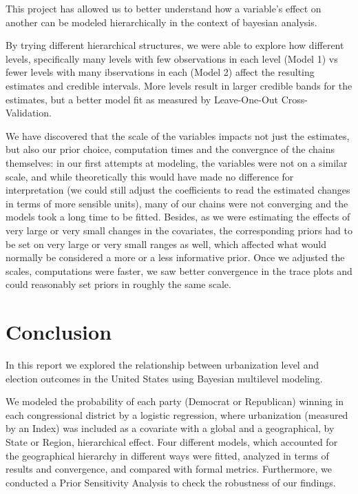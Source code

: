 \documentclass[12pt]{article}
\begin{document}
This project has allowed us to better understand how a variable's effect on another can be modeled hierarchically in the context of bayesian analysis.


By trying different hierarchical structures, we were able to explore how different levels, specifically many levels with few observations in each level (Model 1) vs fewer levels with many ibservations in each (Model 2) affect the resulting estimates and credible intervals. More levels result in larger credible bands for the estimates, but a better model fit as measured by Leave-One-Out Cross-Validation. 

We have discovered that the scale of the variables impacts not just the estimates, but also our prior choice, computation times and the convergnce of the chains themselves: in our first attempts at modeling, the variables were not on a similar scale, and while theoretically this would have made no difference for interpretation (we could still adjust the coefficients to read the estimated changes in terms of more sensible units), many of our chains were not converging and the models took a long time to be fitted.
Besides, as we were estimating the effects of very large or very small changes in the covariates, the corresponding priors had to be set on very large or very small ranges as well, which affected what would normally be considered a more or a less informative prior. Once we adjusted the scales, computations were faster, we saw better convergence in the trace plots and could reasonably set priors in roughly the same scale.

\section{Conclusion}


In this report we explored the relationship between urbanization level and election outcomes in the United States using Bayesian multilevel modeling. 

We modeled the probability of each party (Democrat or Republican) winning in each congressional district by a logistic regression, where urbanization (measured by an Index) was included as a covariate with a global and a geographical, by State or Region, hierarchical effect. Four different models, which accounted for the geographical hierarchy in different ways were fitted, analyzed in terms of results and convergence, and compared with formal metrics. Furthermore, we conducted a Prior Sensitivity Analysis to check the robustness of our findings.
\end{document}
